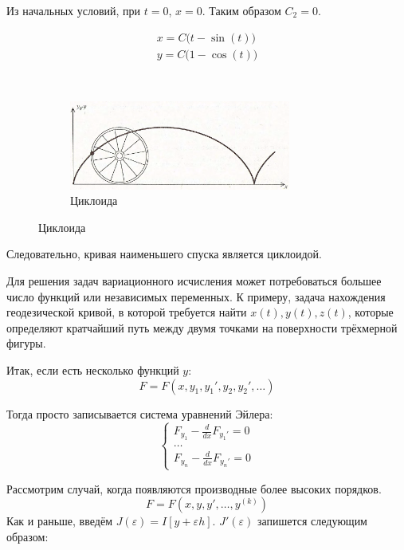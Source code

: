 \documentclass[12pt]{article}
\begin{document}
	Из начальных условий, при $t = 0$, $x = 0$. Таким образом $C_2 = 0$.

	\begin{figure}[H]
			\begin{subfigure}[c]{0.5\textwidth}
			\begin{align*}
					x = C \big(t - \sin(t)\big) \\
					y = C \big(1 - \cos(t)\big)
			\end{align*}		
			\end{subfigure}
			~
			\begin{subfigure}[c]{0.5\textwidth}
					\includegraphics[width=0.8\textwidth]{../Graphics/Lectures-12-cycloid.png}
					\caption{\footnotesize Циклоида }
			\end{subfigure}
	\end{figure}
	
	Следовательно, кривая наименьшего спуска является циклоидой.
	
	Для решения задач вариационного исчисления может потребоваться большее число функций или независимых переменных.
	К примеру, задача нахождения геодезической кривой, в которой требуется найти $x(t), y(t), z(t)$, которые определяют
	кратчайший путь между двумя точками на поверхности трёхмерной фигуры.
	
	Итак, если есть несколько функций $y$:
	$$F = F(x, y_1, y_1', y_2, y_2',\ldots)$$
	
	Тогда просто записывается система уравнений Эйлера:
	$$\left\{
	  \begin{aligned}
	  		  F_{y_1} - \frac{d}{dx}F_{y_1'} = 0 \\
	  		  \dots\\
	  		  F_{y_n} - \frac{d}{dx}F_{y_n'} = 0
	  \end{aligned}
	  \right.$$
	
	Рассмотрим случай, когда появляются производные более высоких порядков. 
	$$F = F(x, y, y', \ldots, y^{(k)})$$		
	Как и раньше, введём $J(\varepsilon) = I[y + \varepsilon h]$. $J'(\varepsilon)$ запишется следующим образом:
	
\end{document}
